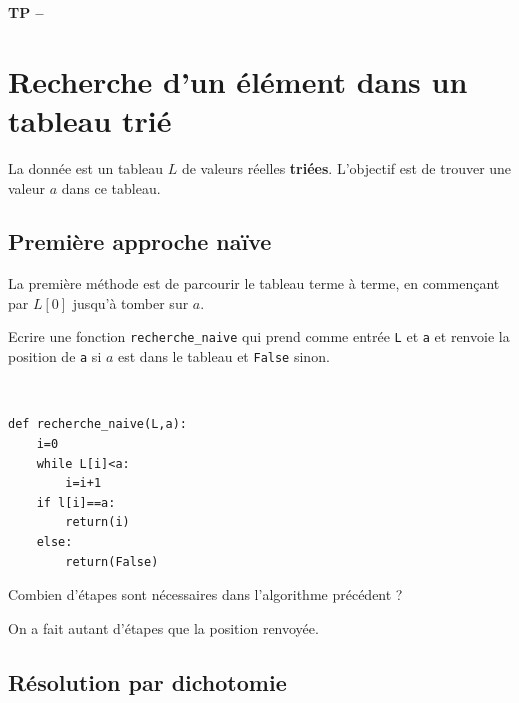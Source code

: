 

%





\begin{center}
{\Large\bf TP \no {\numero} -- \descrip}
\end{center}



\section{Recherche d'un élément dans un tableau trié}

La donnée est un tableau $L$ de valeurs réelles \textbf{triées}. L'objectif est de trouver une valeur $a$ dans ce tableau.

\subsection{Première approche naïve}

La première méthode est de parcourir le tableau terme à terme, en commençant par $L[0]$ jusqu'à tomber sur $a$.

\begin{exercice}
Ecrire une fonction \verb?recherche_naive? qui prend comme entrée \verb?L? et \verb?a? et renvoie la position de \verb?a? si $a$ est dans le tableau et \verb?False? sinon.
\end{exercice}

\begin{solution}~\\
\vspace{-0.7cm}
\begin{verbatim}
def recherche_naive(L,a):
    i=0
    while L[i]<a:
		i=i+1
	if l[i]==a:
		return(i)
	else:
		return(False)    	
\end{verbatim}    
\end{solution}


\begin{exercice}
Combien d'étapes sont nécessaires dans l'algorithme précédent ?
\end{exercice}

\begin{solution}
On a fait autant d'étapes que la position renvoyée.
\end{solution}




\subsection{R\' esolution par dichotomie}

